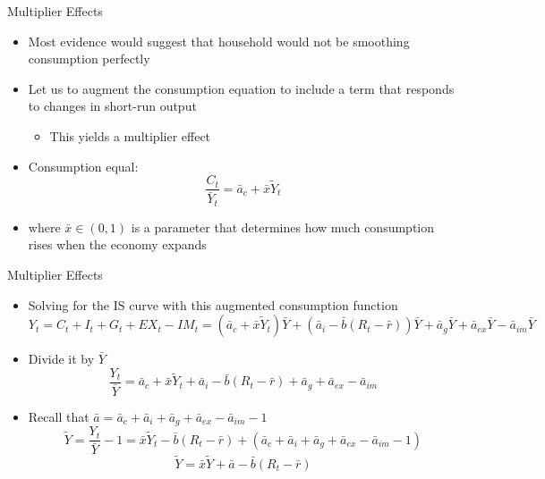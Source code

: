 \documentclass[aspectratio=1610]{beamer}
\begin{document}
\begin{frame}[wide]{Multiplier Effects}
	\begin{itemize}
		\item Most evidence would suggest that household would not be smoothing consumption perfectly
		\item Let us to augment the consumption equation to include a term that responds to changes in short-run output 
		\begin{itemize}
			\item This yields a multiplier effect
		\end{itemize}
		\item Consumption equal:
		\[\frac{C_t}{\bar{Y}_t} = \bar{a}_c + \bar{x} \tilde{Y}_t\]
		\item[] where $\bar{x}\in (0,1)$ is a parameter that determines how much consumption rises when the economy expands
	\end{itemize}
\end{frame}

\begin{frame}[wide]{Multiplier Effects}
	\begin{itemize}
		\item Solving for the IS curve with this augmented consumption function
		\[Y_t = C_t + I_t + G_t +EX_t -IM_t = \left(\bar{a}_c + \bar{x} \tilde{Y}_t\right)\bar{Y}  + \left(\bar{a}_i - \bar{b}\left(R_t -\bar{r}\right)\right)\bar{Y} + \bar{a}_g \bar{Y}  + \bar{a}_{ex}\bar{Y} - \bar{a}_{im}\bar{Y} \]
		\item Divide it by $\bar{Y}$
		\[\frac{Y_t}{\bar{Y}} =  \bar{a}_c + \bar{x} \tilde{Y}_t  + \bar{a}_i - \bar{b}\left(R_t -\bar{r}\right) + \bar{a}_g   + \bar{a}_{ex} - \bar{a}_{im} \]
		\item Recall that $\bar{a} = \bar{a}_c + \bar{a}_i + \bar{a}_g + \bar{a}_{ex} - \bar{a}_{im} - 1$
		\[\tilde{Y} = \frac{Y_t}{\bar{Y}} -1 =   \bar{x} \tilde{Y}_t   - \bar{b}\left(R_t -\bar{r}\right) + \left(\bar{a}_c + \bar{a}_i + \bar{a}_g   + \bar{a}_{ex} - \bar{a}_{im}  -1 \right)\]
		\[\tilde{Y} = \bar{x} \tilde{Y} +\bar{a} - \bar{b}\left(R_t -\bar{r}\right)\]
	\end{itemize}
\end{frame}
\end{document}
